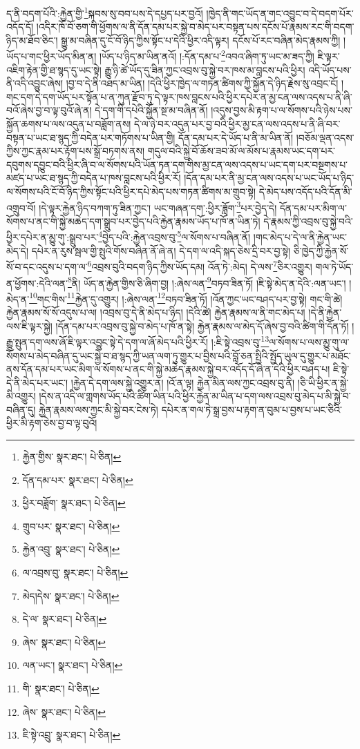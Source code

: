 ད་ནི་བདག་པོའི་:རྐྱེན་གྱི་\footnote{རྐྱེན་གྱིས་  སྣར་ཐང་།  པེ་ཅིན། }སྐབས་སུ་བབ་པས་དེ་དཔྱད་པར་བྱའོ། །ཁྱེད་ནི་གང་ཡོད་ན་གང་འབྱུང་བ་དེ་བདག་པོར་འདོད་དོ། །འདིར་ཁོ་བོ་ཅག་གི་ཕྱོགས་ལ་ནི་དོན་དམ་པར་སྐྱེ་བ་མེད་པར་བསྟན་པས་དངོས་པོ་རྣམས་རང་གི་བདག་ཉིད་མ་ཐོབ་ཅིང་། སྒྱུ་མ་བཞིན་དུ་ངོ་བོ་ཉིད་ཀྱིས་སྟོང་པ་དེའི་ཕྱིར་འདི་ལྟར། དངོས་པོ་རང་བཞིན་མེད་རྣམས་ཀྱི། །ཡོད་པ་གང་ཕྱིར་ཡོད་མིན་ན། །ཡོད་པ་ཉིད་མ་ཡིན་ནའོ། །:དོན་དམ་པ་\footnote{དོན་དམ་པར་  སྣར་ཐང་།  པེ་ཅིན། }འབའ་ཞིག་ཏུ་ཡང་མ་ཟད་ཀྱི། ཇི་ལྟར་འཇིག་རྟེན་གྱི་ཐ་སྙད་དུ་ཡང་སྟེ། རྒྱུ་ཉི་ཚེ་ཡོད་དུ་ཟིན་ཀྱང་འབྲས་བུ་སྐྱེ་བར་ཁས་མ་བླངས་པའི་ཕྱིར། འདི་ཡོད་པས་ནི་འདི་འབྱུང་ཞེས། །བྱ་བ་དེ་ནི་འཐད་མ་ཡིན། །དེའི་ཕྱིར་ཁྱེད་ལ་གཏན་ཚིགས་ཀྱི་སྐྱོན་དེ་ཉིད་རྗེས་སུ་འབྲང་ངོ། །གང་དག་དེ་དག་ཡོད་པར་སྟོན་པ་ན་ཀུན་རྫོབ་ཏུ་དེ་ལྟར་ཁས་བླངས་པའི་ཕྱིར་དཔེར་ན་མྱ་ངན་ལས་འདས་པ་ནི་ཞི་བའོ་ཞེས་བྱ་བ་ལྟ་བུའོ་ཞེ་ན། དེ་དག་གི་དཔེའི་སྐྱོན་སྔ་མ་བཞིན་ནོ། །འདུས་བྱས་མི་རྟག་པ་ལ་སོགས་པའི་ཉེས་པས་སྐྱོན་ཆགས་པ་ལས་འདུན་པ་བཟློག་ནས། དེ་ལ་ཉེ་བར་འདུན་པར་བྱ་བའི་ཕྱིར་མྱ་ངན་ལས་འདས་པ་ནི་ཞི་བར་བསྟན་པ་ཡང་ཐ་སྙད་ཀྱི་བདེན་པར་གཏོགས་པ་ཡིན་གྱི། དོན་དམ་པར་དེ་ཡོད་པ་ནི་མ་ཡིན་ནོ། །བཅོམ་ལྡན་འདས་ཀྱིས་ཀྱང་རྣམ་པར་རྟོག་པས་སྒྲོ་བཏགས་ནས། གདུལ་བའི་སྐྱེ་བོ་ཆོས་ཟབ་མོ་ལ་མོས་པ་རྣམས་ཡང་དག་པར་དབུགས་དབྱུང་བའི་ཕྱིར་ཞི་བ་ལ་སོགས་པའི་ཡོན་ཏན་དག་གིས་མྱ་ངན་ལས་འདས་པ་ཡང་དག་པར་བསྔགས་པ་མཛད་པ་ཡང་ཐ་སྙད་ཀྱི་བདེན་པ་ཁས་བླངས་པའི་ཕྱིར་རོ། །དོན་དམ་པར་ནི་མྱ་ངན་ལས་འདས་པ་ཡང་ཡོད་པ་ཉིད་ལ་སོགས་པའི་ངོ་བོ་ཉིད་ཀྱིས་སྟོང་པའི་ཕྱིར་དཔེ་མེད་པས་གཏན་ཚིགས་མ་གྲུབ་སྟེ། དེ་མེད་པས་འདོད་པའི་དོན་མི་འགྲུབ་བོ། །དེ་ལྟར་རྐྱེན་ཉིད་བཀག་ཏུ་ཟིན་ཀྱང་། ཡང་གཞན་དག་:ཕྱིར་ཟློག་\footnote{ཕྱིར་བཟློག་  སྣར་ཐང་།  པེ་ཅིན། }པར་བྱེད་དེ། དོན་དམ་པར་མིག་ལ་སོགས་པ་ནང་གི་སྐྱེ་མཆེད་དག་སྒྲུབ་པར་བྱེད་པའི་རྐྱེན་རྣམས་ཡོད་པ་ཁོ་ན་ཡིན་ཏེ། དེ་རྣམས་ཀྱི་འབྲས་བུ་སྐྱེ་བའི་ཕྱིར་དཔེར་ན་མྱུ་གུ་:སྒྲུབ་པར་\footnote{གྲུབ་པར་  སྣར་ཐང་།  པེ་ཅིན། }བྱེད་པའི་:རྐྱེན་འབྲས་བུ་\footnote{རྐྱེན་འབྲུ་  སྣར་ཐང་།  པེ་ཅིན། }ལ་སོགས་པ་བཞིན་ནོ། །གང་མེད་པ་དེ་ལ་ནི་རྐྱེན་ཡང་མེད་དེ། དཔེར་ན་རུས་སྦལ་གྱི་སྤུའི་གོས་བཞིན་ནོ་ཞེ་ན། དེ་དག་ལ་འདི་སྐད་ཅེས་དྲི་བར་བྱ་སྟེ། ཅི་ཁྱེད་ཀྱི་རྐྱེན་སོ་སོ་བ་དང་འདུས་པ་དག་ལ་\footnote{ལ་འབྲས་བུ་  སྣར་ཐང་།  པེ་ཅིན། }འབྲས་བུའི་བདག་ཉིད་ཀྱིས་ཡོད་དམ། འོན་ཏེ་:མེད། དེ་ལས་\footnote{མེད།དེས་  སྣར་ཐང་།  པེ་ཅིན། }ཅིར་འགྱུར། གལ་ཏེ་ཡོད་ན་ཕྱོགས་:དེའི་ལན་\footnote{དེ་ལ་  སྣར་ཐང་།  པེ་ཅིན། }ནི། ཡོད་ན་རྐྱེན་གྱིས་ཅི་ཞིག་བྱ། །:ཞེས་ལན་\footnote{ཞེས་  སྣར་ཐང་།  པེ་ཅིན། }བཏབ་ཟིན་ཏོ། །ཇི་སྟེ་མེད་ན་དེའི་:ལན་ཡང་། །མེད་ན་\footnote{ལན་ཡང་།  སྣར་ཐང་།  པེ་ཅིན། }གང་གིས་\footnote{གི་  སྣར་ཐང་།  པེ་ཅིན། }རྐྱེན་དུ་འགྱུར། །:ཞེས་ལན་\footnote{ཞེས་  སྣར་ཐང་།  པེ་ཅིན། }བཏབ་ཟིན་ཏོ། །འོན་ཀྱང་ཡང་བཤད་པར་བྱ་སྟེ། གང་གི་ཚེ། རྐྱེན་རྣམས་སོ་སོ་འདུས་པ་ལ། །འབྲས་བུ་དེ་ནི་མེད་པ་ཉིད། །དེའི་ཚེ། རྐྱེན་རྣམས་ལ་ནི་གང་མེད་པ། །དེ་ནི་རྐྱེན་ལས་ཇི་ལྟར་སྐྱེ། །དོན་དམ་པར་འབྲས་བུ་སྐྱེ་བ་མེད་པ་ཁོ་ན་སྟེ། རྐྱེན་རྣམས་ལ་མེད་དོ་ཞེས་བྱ་བའི་ཚིག་གི་དོན་ཏོ། །རྒྱུ་སྤུན་དག་ལས་ཞོ་ཇི་ལྟར་འབྱུང་སྟེ་དེ་དག་ལ་ཞོ་མེད་པའི་ཕྱིར་རོ། །:ཇི་སྟེ་འབྲས་བུ་\footnote{ཇི་སྟེ་འབྲུ་  སྣར་ཐང་།  པེ་ཅིན། }ལ་སོགས་པ་ལས་མྱུ་གུ་ལ་སོགས་པ་མེད་བཞིན་དུ་ཡང་སྐྱེ་བ་ཐ་སྙད་ཀྱི་ཡན་ལག་ཏུ་གྱུར་པ་བྱིས་པའི་བློ་ཅན་སྤྱིའི་སྤྱོད་ཡུལ་དུ་གྱུར་པ་མཐོང་ནས་དོན་དམ་པར་ཡང་མིག་ལ་སོགས་པ་ནང་གི་སྐྱེ་མཆེད་རྣམས་སྐྱེ་བར་འདོད་དོ་ཞེ་ན་དེའི་ཕྱིར་བཤད་པ། ཇི་སྟེ་དེ་ནི་མེད་པར་ཡང་། །རྐྱེན་དེ་དག་ལས་སྐྱེ་འགྱུར་ན། །འོ་ན་ལྟ། རྐྱེན་མིན་ལས་ཀྱང་འབྲས་བུ་ནི། །ཅི་ཡི་ཕྱིར་ན་སྐྱེ་མི་འགྱུར། །དེས་ན་འདི་ལ་གླགས་ཡོད་པའི་ཚིག་ཡིན་པའི་ཕྱིར་རྐྱེན་མ་ཡིན་པ་དག་ལས་འབྲས་བུ་མེད་པ་མི་སྐྱེ་བ་བཞིན་དུ། རྐྱེན་རྣམས་ལས་ཀྱང་མི་སྐྱེ་བར་ངེས་ཏེ། དཔེར་ན་གལ་ཏེ་སྒྲ་བྱས་པ་རྟག་ན་བུམ་པ་བྱས་པ་ཡང་ཅིའི་ཕྱིར་མི་རྟག་ཅེས་བྱ་བ་ལྟ་བུའོ། 
